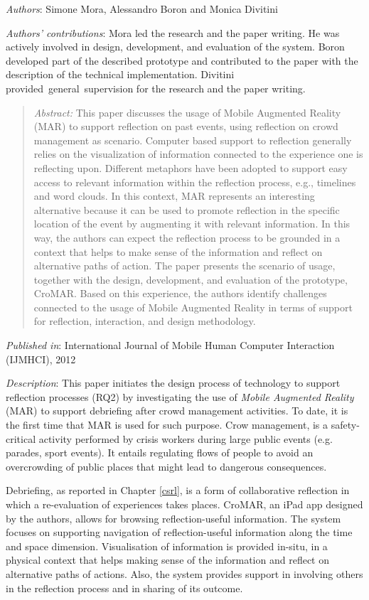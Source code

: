 \emph{Authors}: Simone Mora, Alessandro Boron and Monica Divitini

\emph{Authors' contributions}: Mora led the research and the paper writing. He was actively involved in design, development, and evaluation of the system. Boron developed part of the described prototype and contributed to the paper with the description of the technical implementation. Divitini provided~general~supervision for the research and the paper writing. 

\begin{quote}
	\emph{Abstract:} This paper discusses the usage of Mobile Augmented Reality (MAR) to support reflection on past events, using reflection on crowd management as scenario. Computer based support to reflection generally relies on the visualization of information connected to the experience one is reflecting upon. Different metaphors have been adopted to support easy access to relevant information within the reflection process, e.g., timelines and word clouds. In this context, MAR represents an interesting alternative because it can be used to promote reflection in the specific location of the event by augmenting it with relevant information. In this way, the authors can expect the reflection process to be grounded in a context that helps to make sense of the information and reflect on alternative paths of action. The paper presents the scenario of usage, together with the design, development, and evaluation of the prototype, CroMAR. Based on this experience, the authors identify challenges connected to the usage of Mobile Augmented Reality in terms of support for reflection, interaction, and design methodology. 
\end{quote}

\emph{Published in}: International Journal of Mobile Human Computer Interaction (IJMHCI), 2012

\emph{Description}: This paper initiates the design process of technology to support reflection processes (RQ2) by investigating the use of \emph{Mobile Augmented Reality} (MAR) to support debriefing after crowd management activities. To date, it is the first time that MAR is used for such purpose. Crow management, is a safety-critical activity performed by crisis workers during large public events (e.g. parades, sport events). It entails regulating flows of people to avoid an overcrowding of public places that might lead to dangerous consequences. 

Debriefing, as reported in Chapter \ref{csrl}, is a form of collaborative reflection in which a re-evaluation of experiences takes places. CroMAR, an iPad app designed by the authors, allows for browsing reflection-useful information. The system focuses on supporting navigation of reflection-useful information along the time and space dimension. Visualisation of information is provided in-situ, in a physical context that helps making sense of the information and reflect on alternative paths of actions. Also, the system provides support in involving others in the reflection process and in sharing of its outcome.

